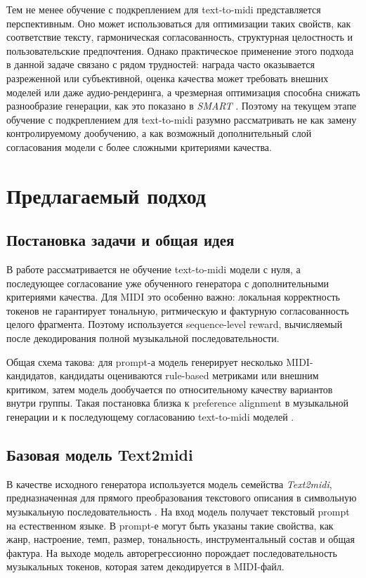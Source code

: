 \documentclass[a4paper,12pt]{extarticle}
\begin{document}
Тем не менее обучение с подкреплением для text-to-midi представляется
перспективным. Оно может использоваться для оптимизации таких свойств,
как соответствие тексту, гармоническая согласованность, структурная
целостность и пользовательские предпочтения. Однако практическое
применение этого подхода в данной задаче связано с рядом трудностей:
награда часто оказывается разреженной или субъективной, оценка качества
может требовать внешних моделей или даже аудио-рендеринга, а чрезмерная
оптимизация способна снижать разнообразие генерации, как это показано в
\textit{SMART} \cite{smart2025}. Поэтому на текущем этапе обучение с
подкреплением для text-to-midi разумно рассматривать не как замену
контролируемому дообучению, а как возможный дополнительный слой
согласования модели с более сложными критериями качества.

\section{Предлагаемый подход}
\label{sec:approach}

\subsection{Постановка задачи и общая идея}

В работе рассматривается не обучение text-to-midi модели с нуля, а
последующее согласование уже обученного генератора с дополнительными
критериями качества. Для MIDI это особенно важно: локальная корректность
токенов не гарантирует тональную, ритмическую и фактурную
согласованность целого фрагмента. Поэтому используется sequence-level
reward, вычисляемый после декодирования полной музыкальной
последовательности.

Общая схема такова: для prompt-а модель генерирует несколько
MIDI-кандидатов, кандидаты оцениваются rule-based метриками или внешним
критиком, затем модель дообучается по относительному качеству вариантов
внутри группы. Такая постановка близка к preference alignment в
музыкальной генерации \cite{musicrl2024,jonason2025smart} и к
последующему согласованию text-to-midi моделей
\cite{text2midiinferalign2025}.

\subsection{Базовая модель Text2midi}

В качестве исходного генератора используется модель семейства
\textit{Text2midi}, предназначенная для прямого преобразования
текстового описания в символьную музыкальную последовательность
\cite{text2midi2025}. На вход модель получает текстовый prompt на
естественном языке. В prompt-е могут быть указаны такие свойства, как
жанр, настроение, темп, размер, тональность, инструментальный состав и
общая фактура. На выходе модель авторегрессионно порождает
последовательность музыкальных токенов, которая затем декодируется в
MIDI-файл.
\end{document}
